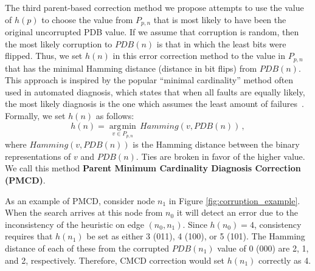 \documentclass{article}
\DeclareMathOperator*{\argmin}{\arg\!\min}
\begin{document}


The third parent-based correction method we propose attempts to use the value of $h(p)$ to choose the value from $P_{p,n}$ that is most likely to have been the original uncorrupted PDB value. If we assume that corruption is random, then the most likely corruption to $PDB(n)$ is that in which the least bits were flipped. Thus, we set $h(n)$ in this error correction method to the value in $P_{p,n}$ that has the minimal Hamming distance (distance in bit flips) from $PDB(n)$. 
This approach is inspired by the popular ``minimal cardinality'' method often used in automated diagnosis, which states that when all faults are equally likely, the most likely diagnosis is the one which assumes the least amount of failures~\cite{de1987diagnosing}.
Formally, we set $h(n)$ as follows:
\begin{equation}
h(n) = \underset{v \in P_{p,n}}{\argmin} \, Hamming(v, PDB(n)) \,,
\end{equation}
\noindent
where $Hamming(v, PDB(n))$ is the Hamming distance between the binary representations of $v$ and $PDB(n)$. Ties are broken in favor of the higher value. 
We call this method \textbf{Parent Minimum Cardinality Diagnosis Correction (PMCD)}.

As an example of PMCD, consider node $n_1$ in Figure \ref{fig:corruption_example}. When the search arrives at this node from $n_0$ it will detect an error due to the inconsistency of the heuristic on edge $(n_0, n_1)$.
Since $h(n_0)=4$, consistency requires that $h(n_1)$ be set as either 3 (011), 4 (100), or 5 (101). The Hamming distance of each of these from the corrupted $PDB(n_1)$ value of 0 (000) are 2, 1, and 2, respectively.
Therefore, CMCD correction would set $h(n_1)$ correctly as 4.
\end{document}
